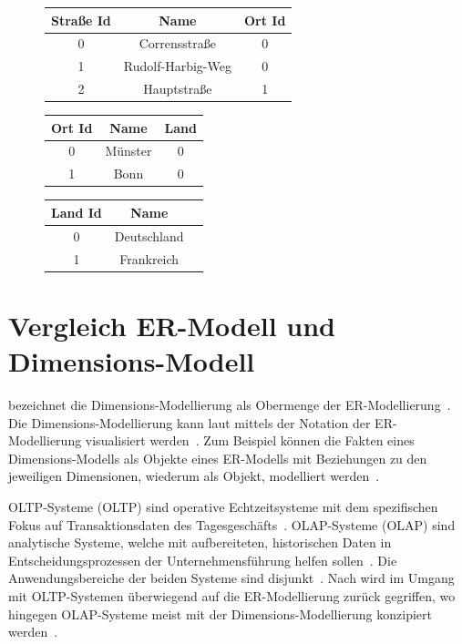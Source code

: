 \documentclass[
  language=german, %
  type=bachelor%
]{isthesis}
\begin{document}
\begin{content}
  \begin{figure}[caption={Beispiel der Dimensionstabellen \textit{Ort} im Snowflake-Schema}, label={table:dimension-table}]
    \begin{tabular}{c c c }
      Straße Id & Name & Ort Id \\
      \toprule
      0 & Corrensstraße & 0 \\
      1 & Rudolf-Harbig-Weg & 0 \\
      2 & Hauptstraße & 1 \\
    \end{tabular}
    \begin{tabular}{c c c}
      Ort Id & Name & Land \\
      \toprule
      0 & Münster & 0 \\
      1 & Bonn & 0 \\
    \end{tabular}
    \begin{tabular}{c c c }
      Land Id & Name \\
      \toprule
      0 & Deutschland \\
      1 & Frankreich \\
    \end{tabular}
  \end{figure}

  \section{Vergleich ER-Modell und Dimensions-Modell}
  \textsc{\citeauthor{ballard1998data}} bezeichnet die Dimensions-Modellierung
  als Obermenge der ER-Modellierung~\cite[][S. 47]{ballard1998data}. Die
  Dimensions-Modellierung kann laut \textsc{\citeauthor{ballard1998data}}
  mittels der Notation der ER-Modellierung visualisiert werden~\cite[][S.
  47]{ballard1998data}. Zum Beispiel können die Fakten eines Dimensions-Modells
  als Objekte eines ER-Modells mit Beziehungen zu den jeweiligen Dimensionen,
  wiederum als Objekt, modelliert werden~\cite[][S. 48]{ballard1998data}. 

  \acrlong{OLTP}-Systeme (OLTP) sind operative Echtzeitsysteme mit dem
  spezifischen Fokus auf Transaktionsdaten des Tagesgeschäfts~\cite[][S.
  11]{gabriel2009data}. \acrlong{OLAP}-Systeme (OLAP) sind analytische Systeme,
  welche mit aufbereiteten, historischen Daten in Entscheidungsprozessen der
  Unternehmensführung helfen sollen~\cite[][S. 1]{chaudhuri1997overview}. Die
  Anwendungsbereiche der beiden Systeme sind disjunkt~\cite[][S.
  334]{chamoni2000line}. Nach \textsc{\citeauthor{phipps2002automating}} wird
  im Umgang mit \acrshort{OLTP}-Systemen überwiegend auf die ER-Modellierung
  zurück gegriffen, wo hingegen \acrshort{OLAP}-Systeme meist mit der
  Dimensions-Modellierung konzipiert werden~\cite[][S.
  2]{phipps2002automating}. 


\end{content}
\end{document}
